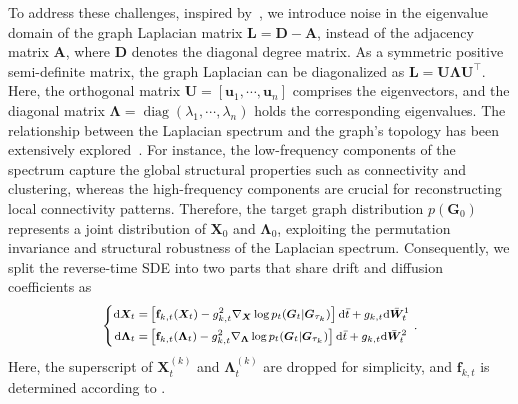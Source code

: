 To address these challenges, inspired by~\citet{GAN2-Spectre,GSDM+TPAMI2023}, we introduce noise in the eigenvalue domain of the graph Laplacian matrix $\bm{L}=\bm{D}-\bm{A}$, instead of the adjacency matrix $\bm{A}$, where $\bm{D}$ denotes the diagonal degree matrix.
%
As a symmetric positive semi-definite matrix, the graph Laplacian can be diagonalized as $\bm{L} = \bm{U} \bm{\Lambda} \bm{U}^\top$. Here, the orthogonal matrix $\bm{U} = [\bm{u}_1,\cdots,\bm{u}_n]$ comprises the eigenvectors, and the diagonal matrix $\bm{\Lambda} = \operatorname{diag}(\lambda_1,\cdots,\lambda_n)$ holds the corresponding eigenvalues.
The relationship between the Laplacian spectrum and the graph's topology has been extensively explored~\cite{chung1997spectral}. For instance,  the low-frequency components of the spectrum capture the global structural properties such as connectivity and clustering, whereas the high-frequency components are crucial for reconstructing local connectivity patterns.
%
%
Therefore, the target graph distribution $p(\bm{G}_0)$ represents a joint distribution of $\bm{X}_0$ and $\bm{\Lambda}_0$, exploiting the permutation invariance and structural robustness of the Laplacian spectrum.
%
Consequently, we split the reverse-time SDE into two parts that share drift and diffusion coefficients as
\begin{equation}
\fontsize{8pt}{8pt}\selectfont
\left\{
\begin{aligned}
\mathrm{d}\bm{X}_t=
&\left[\mathbf{f}_{k,t}(\bm{X}_t)
-g_{k,t}^2 
\nabla_{\bm{X}} \log p_t(\bm{G}_t | \bm{G}_{\tau_k}) \right]\mathrm{d}\bar{t}
+g_{k,t}\mathrm{d}\bar{\bm{W}}_{t}^1
\\
\mathrm{d}\bm{\Lambda}_t=
&\left[\mathbf{f}_{k,t}(\bm{\Lambda}_t)
- g_{k,t}^2 \nabla_{\bm{\Lambda}} \log p_t(\bm{G}_t | \bm{G}_{\tau_k})\right]\mathrm{d}\bar{t}
+g_{k,t}\mathrm{d}\bar{\bm{W}}_{t}^2
\end{aligned}
\right..\nonumber
\fontsize{10pt}{10pt}\selectfont
\label{eq:reverse-HoGD}
\end{equation}
Here, the superscript of $\bm{X}^{(k)}_t$ and $\bm{\Lambda}^{(k)}_t$ are dropped for simplicity, and $\mathbf{f}_{k,t}$ is determined according to .



